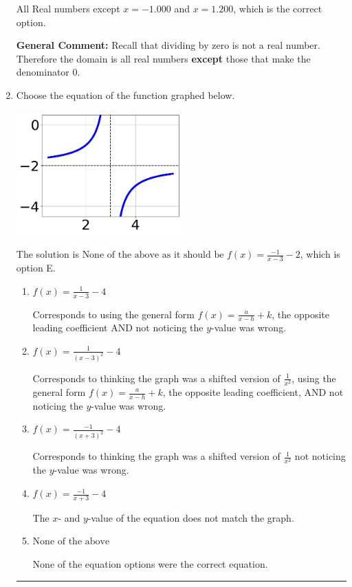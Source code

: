 \documentclass{extbook}[14pt]
\newcommand{\litem}[1]{\item #1

\rule{\textwidth}{0.4pt}}
\begin{document}
\begin{enumerate}
{\begin{enumerate}[label=\Alph*.]
All Real numbers except $x = -1.000$ and $x = 1.200$, which is the correct option.
\end{enumerate}

\textbf{General Comment:} Recall that dividing by zero is not a real number. Therefore the domain is all real numbers \textbf{except} those that make the denominator 0.
}
\litem{
Choose the equation of the function graphed below.

\begin{center}
    \includegraphics[width=0.5\textwidth]{../Figures/rationalGraphToEquationA.png}
\end{center}




The solution is \( \text{None of the above as it should be } f(x) = \frac{-1}{x - 3} - 2 \), which is option E.\begin{enumerate}[label=\Alph*.]
\item \( f(x) = \frac{1}{x - 3} - 4 \)

Corresponds to using the general form $f(x) = \frac{a}{x-h}+k$, the opposite leading coefficient AND not noticing the $y$-value was wrong.
\item \( f(x) = \frac{1}{(x - 3)^2} - 4 \)

Corresponds to thinking the graph was a shifted version of $\frac{1}{x^2}$, using the general form $f(x) = \frac{a}{x-h}+k$, the opposite leading coefficient, AND not noticing the $y$-value was wrong.
\item \( f(x) = \frac{-1}{(x + 3)^2} - 4 \)

Corresponds to thinking the graph was a shifted version of $\frac{1}{x^2}$ not noticing the $y$-value was wrong.
\item \( f(x) = \frac{-1}{x + 3} - 4 \)

The $x$- and $y$-value of the equation does not match the graph.
\item \( \text{None of the above} \)

None of the equation options were the correct equation.
\end{enumerate}

}
\end{enumerate}
\end{document}
